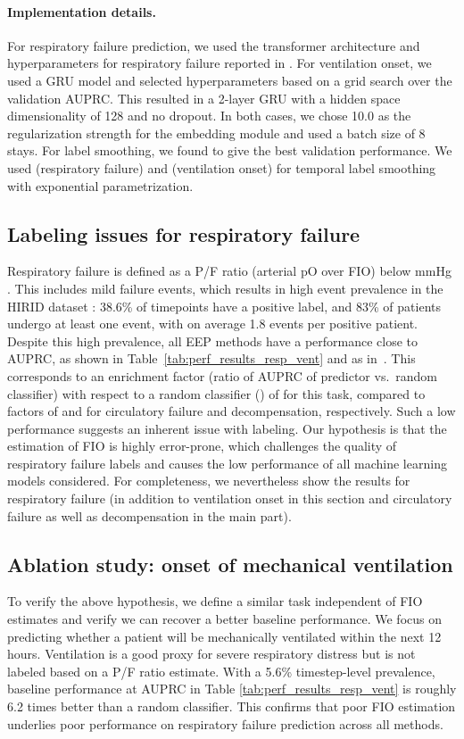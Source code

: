 \documentclass[nohyperref]{article}
\begin{document}
 \paragraph{Implementation details.} For respiratory failure prediction, we used the transformer architecture and hyperparameters for {respiratory failure} reported in \citet{yeche2021}. For ventilation onset, we used a GRU model and selected hyperparameters based on a grid search over the validation AUPRC. This resulted in a 2-layer GRU with a hidden space dimensionality of 128 and no dropout. In both cases, we chose 10.0 as the  regularization strength for the embedding module and used a batch size of 8 stays. For label smoothing, we found  to give the best validation performance. We used  (respiratory failure) and  (ventilation onset) for temporal label smoothing with exponential parametrization.
 
\subsection{Labeling issues for respiratory failure}
\label{sec:label-issues}

Respiratory failure is defined as a P/F ratio (arterial pO over FIO) below  mmHg \citep{yeche2021}. This includes mild failure events, which results in high event prevalence in the HIRID dataset \citep{hyland2020}: 38.6\% of timepoints have a positive label, and 83\% of patients undergo at least one event, with on average 1.8 events per positive patient. Despite this high prevalence, all EEP methods have a performance close to  AUPRC, as shown in Table~\ref{tab:perf_results_resp_vent} and as in~\citet{yeche2021}. This corresponds to an enrichment factor (ratio of AUPRC of predictor vs.\ random classifier) with respect to a random classifier () of  for this task, compared to factors of  and  for circulatory failure and decompensation, respectively. Such a low performance suggests an inherent issue with labeling. Our hypothesis is that the estimation of FIO is highly error-prone, which challenges the quality of respiratory failure labels and causes the low performance of all machine learning models considered. For completeness, we nevertheless show the results for respiratory failure (in addition to ventilation onset in this section and circulatory failure as well as decompensation in the main part).

\subsection{Ablation study: onset of mechanical ventilation}
 To verify the above hypothesis, we define a similar task independent of FIO estimates and verify we can recover a better baseline performance. We focus on predicting whether a patient will be mechanically ventilated within the next 12 hours. Ventilation is a good proxy for severe respiratory distress but is not labeled based on a P/F ratio estimate. With a 5.6\% timestep-level prevalence, baseline performance at  AUPRC in Table \ref{tab:perf_results_resp_vent} is roughly 6.2 times better than a random classifier. This confirms that poor FIO estimation underlies poor performance on respiratory failure prediction across all methods. 
\end{document}
